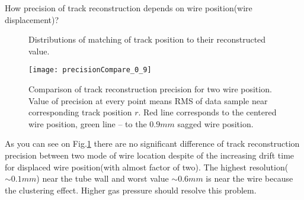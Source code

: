 	How precision of track reconstruction depends on wire position(wire displacement)?
	
	\begin{figure}[h!]
		\centering
		\qquad
		\caption{Distributions of matching of track position to their reconstructed value.}
	\end{figure}
	
	\begin{figure}[h!]
	\centering
	\texttt{[image: precisionCompare\_0\_9]}
	\caption{Comparison of track reconstruction precision for two wire position. Value of precision at every point means RMS of data sample near corresponding track position $r$. Red line corresponds to the centered wire position, green line -- to the $0.9 mm$ sagged wire  position.}
		
	\label{fig:precisionCompare09}
	
	\end{figure}
	
	As you can see on Fig.\ref{fig:precisionCompare09} there are no significant difference of track reconstruction precision between two mode of wire location despite of the increasing drift time for displaced wire position(with almost factor of two).	 The highest resolution($\sim 0.1 mm$) near the tube wall and worst value $\sim0.6mm$ is near the wire because the clustering effect. Higher gas pressure should resolve this problem.